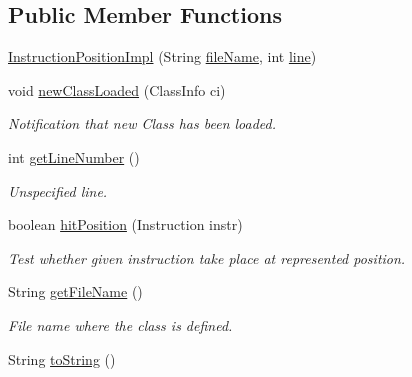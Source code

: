 \subsection*{Public Member Functions}
\begin{DoxyCompactItemize}
\item 
\hyperlink{classgov_1_1nasa_1_1jpf_1_1inspector_1_1server_1_1breakpoints_1_1_instruction_position_impl_a20a76a0c1e28bba60cd680476da3807a}{Instruction\+Position\+Impl} (String \hyperlink{classgov_1_1nasa_1_1jpf_1_1inspector_1_1server_1_1breakpoints_1_1_instruction_position_impl_a516c1bf9f9237fa2da514022d0ed4679}{file\+Name}, int \hyperlink{classgov_1_1nasa_1_1jpf_1_1inspector_1_1server_1_1breakpoints_1_1_instruction_position_impl_ab362ce71d6d351401c64199096a5a75c}{line})
\item 
void \hyperlink{classgov_1_1nasa_1_1jpf_1_1inspector_1_1server_1_1breakpoints_1_1_instruction_position_impl_ac4beaec76a586dfba936cae0f25f9e86}{new\+Class\+Loaded} (Class\+Info ci)
\begin{DoxyCompactList}\small\item\em Notification that new Class has been loaded. \end{DoxyCompactList}\item 
int \hyperlink{classgov_1_1nasa_1_1jpf_1_1inspector_1_1server_1_1breakpoints_1_1_instruction_position_impl_a0ebbca9205ea60a39c4ee0c99f9a4272}{get\+Line\+Number} ()
\begin{DoxyCompactList}\small\item\em Unspecified line. \end{DoxyCompactList}\item 
boolean \hyperlink{classgov_1_1nasa_1_1jpf_1_1inspector_1_1server_1_1breakpoints_1_1_instruction_position_impl_a684f11d2a16eafa3bac9e4f7e62fc0e1}{hit\+Position} (Instruction instr)
\begin{DoxyCompactList}\small\item\em Test whether given instruction take place at represented position. \end{DoxyCompactList}\item 
String \hyperlink{classgov_1_1nasa_1_1jpf_1_1inspector_1_1server_1_1breakpoints_1_1_instruction_position_impl_ae7c8f0c324b83e4f7dcad553f9bd4bb9}{get\+File\+Name} ()
\begin{DoxyCompactList}\small\item\em File name where the class is defined. \end{DoxyCompactList}\item 
String \hyperlink{classgov_1_1nasa_1_1jpf_1_1inspector_1_1server_1_1breakpoints_1_1_instruction_position_impl_a573155e2a3c273d257eb8a2fdefe9eed}{to\+String} ()

\end{DoxyCompactItemize}

